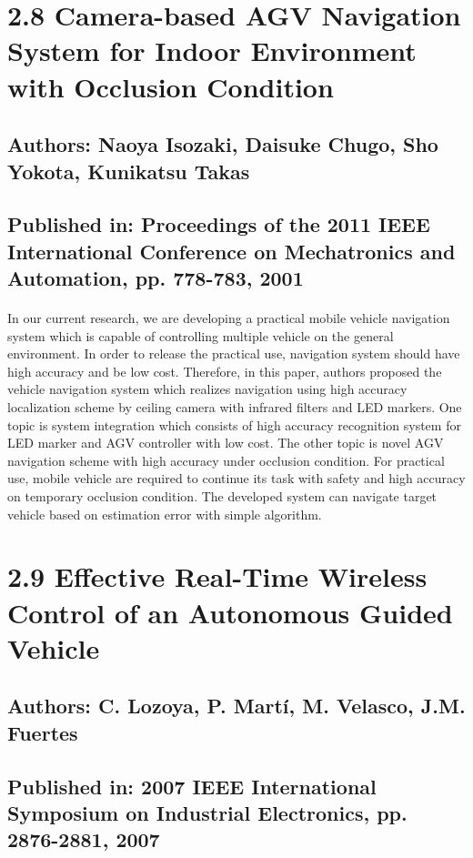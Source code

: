 \section*{2.8 Camera-based AGV Navigation System for Indoor Environment with Occlusion Condition\cite{NIsozaki}}
\subsection*{Authors: Naoya Isozaki, Daisuke Chugo, Sho Yokota, Kunikatsu Takas}
\subsection*{Published in: Proceedings of the 2011 IEEE International Conference on Mechatronics and Automation, pp. 778-783, 2001}
\paragraph{}In our current research, we are developing a practical mobile vehicle navigation system which is capable of controlling multiple vehicle on the general environment. In order to release the practical use, navigation system should have high accuracy and be low cost. Therefore, in this paper, authors proposed the vehicle navigation system which realizes navigation using high accuracy localization scheme by ceiling camera with infrared filters and LED markers. One topic is system integration which consists of high accuracy recognition system for LED marker and AGV controller with low cost. The other topic is novel AGV navigation scheme with high accuracy under occlusion condition. For practical use, mobile vehicle are required to continue its task with safety and high accuracy on temporary occlusion condition. The developed system can navigate target vehicle based on estimation error with simple algorithm.
\vspace{-0.3cm}
\section*{2.9 Effective Real-Time Wireless Control of an Autonomous Guided Vehicle\cite{CLozoya}}
\subsection*{Authors: C. Lozoya, P. Martí, M. Velasco, J.M. Fuertes}
\subsection*{Published in: 2007 IEEE International Symposium on Industrial Electronics, pp. 2876-2881, 2007}
